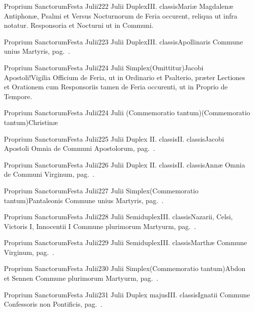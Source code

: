 \documentclass[nocturnale-romanum.tex]{subfiles}
\begin{document}
	{Proprium Sanctorum}{Festa Julii}{2}{22 Julii}
	{Duplex}{III. classis}{Mariæ Magdalenæ}
	{Antiphonæ, Psalmi et Versus Nocturnorum de Feria occurent, reliqua ut infra notatur. %
	Responsoria  et  Nocturni ut in Communi.}
	{}

	{Proprium Sanctorum}{Festa Julii}{2}{23 Julii}
	{Duplex}{III. classis}{Apollinaris}
	{Commune unius Martyris, pag.\ \pageref{M-UMEX}.}
	{}

	{Proprium Sanctorum}{Festa Julii}{2}{24 Julii}
	{Simplex}{(Omittitur)}{Jacobi Apostoli!Vigilia}
	{Officium de Feria, ut in Ordinario et Psalterio, præter Lectiones et Orationem cum Responsoriis tamen de Feria occurenti, ut in Proprio de Tempore.}
	{}

	{Proprium Sanctorum}{Festa Julii}{2}{24 Julii}
	{(Commemoratio tantum)}{(Commemoratio tantum)}{Christinæ}
	{}
	{}

	{Proprium Sanctorum}{Festa Julii}{2}{25 Julii}
	{Duplex II. classis}{II. classis}{Jacobi Apostoli}
	{Omnia de Communi Apostolorum, pag.\ \pageref{M-APEX}.}
	{}

	{Proprium Sanctorum}{Festa Julii}{2}{26 Julii}
	{Duplex II. classis}{II. classis}{Annæ}
	{Omnia de Communi Virginum, pag.\ \pageref{M-MU}.}
	{}

	{Proprium Sanctorum}{Festa Julii}{2}{27 Julii}
	{Simplex}{(Commemoratio tantum)}{Pantaleonis}
	{Commune unius Martyris, pag.\ \pageref{M-UMEX}.}
	{}

	{Proprium Sanctorum}{Festa Julii}{2}{28 Julii}
	{Semiduplex}{III. classis}{Nazarii, Celsi, Victoris I, Innocentii I}
	{Commune plurimorum Martyurm, pag.\ \pageref{M-PMEX}.}
	{}

	{Proprium Sanctorum}{Festa Julii}{2}{29 Julii}
	{Semiduplex}{III. classis}{Marthæ}
	{Commune Virginum, pag.\ \pageref{M-MU}.}
	{}

	{Proprium Sanctorum}{Festa Julii}{2}{30 Julii}
	{Simplex}{(Commemoratio tantum)}{Abdon et Sennen}
	{Commune plurimorum Martyurm, pag.\ \pageref{M-PMEX}.}
	{}

	{Proprium Sanctorum}{Festa Julii}{2}{31 Julii}
	{Duplex majus}{III. classis}{Ignatii}
	{Commune Confessoris non Pontificis, pag.\ \pageref{M-CONP}.}
	{}
\end{document}
